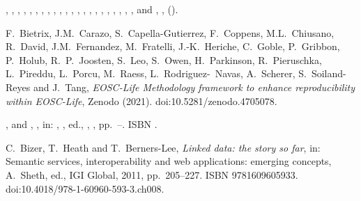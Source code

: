 \documentclass[ds,v1.1.2,openaccess]{iosart2x}%
\begin{document}
\begin{thebibliography}{}
%
\begin{barticle}
,
,
,
,
,
,
,
,
,
,
,
,
,
,
,
,
,
,
,
,
,
,
 and
,
,
().
\end{barticle}
%
\OrigBibText
F.~Bietrix,
J.M.~Carazo,
S.~Capella-Gutierrez,
F.~Coppens,
M.L.~Chiusano,
R.~David,
J.M.~Fernandez,
M.~Fratelli,
J.-K.~Heriche,
C.~Goble,
P.~Gribbon,
P.~Holub,
R.~P.~Joosten,
S.~Leo,
S.~Owen,
H.~Parkinson,
R.~Pieruschka,
L.~Pireddu,
L.~Porcu,
M.~Raess,
L.~Rodriguez-~Navas,
A.~Scherer,
S.~Soiland-Reyes and
J.~Tang,
\textit{{EOSC}-Life Methodology framework to enhance reproducibility within
{EOSC}-Life},
Zenodo
(2021).
doi:10.5281/zenodo.4705078.
\endOrigBibText
{}
\endbibitem

%
\begin{bchapter}
,
 and
,
,
in: ,
, ed.,
,
,
pp.~--.
ISBN .
\end{bchapter}
%
\OrigBibText
C.~Bizer,
T.~Heath and
T.~Berners-Lee,
\textit{Linked data: the story so far},
in: Semantic services, interoperability and web applications: emerging
concepts,
A.~Sheth, ed.,
{IGI} Global,
2011,
pp.~205--227.
ISBN 9781609605933.
doi:10.4018/978-1-60960-593-3.ch008.
\endOrigBibText
{}
\endbibitem


\end{thebibliography}
\end{document}
